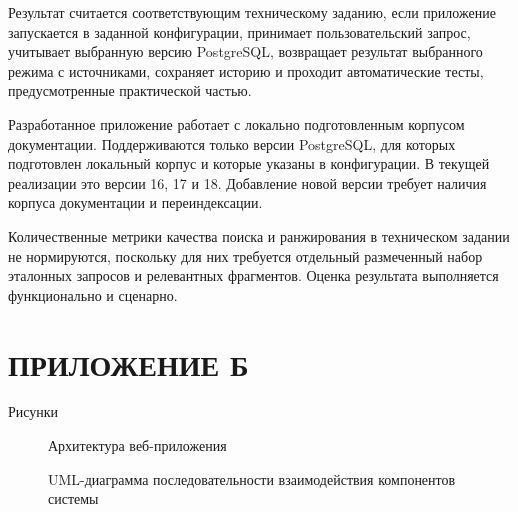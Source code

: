 Результат считается соответствующим техническому заданию, если приложение запускается в заданной конфигурации, принимает пользовательский запрос, учитывает выбранную версию PostgreSQL, возвращает результат выбранного режима с источниками, сохраняет историю и проходит автоматические тесты, предусмотренные практической частью.


Разработанное приложение работает с локально подготовленным корпусом документации. Поддерживаются только версии PostgreSQL, для которых подготовлен локальный корпус и которые указаны в конфигурации. В текущей реализации это версии 16, 17 и 18. Добавление новой версии требует наличия корпуса документации и переиндексации.

Количественные метрики качества поиска и ранжирования в техническом задании не нормируются, поскольку для них требуется отдельный размеченный набор эталонных запросов и релевантных фрагментов. Оценка результата выполняется функционально и сценарно.

\chapter[ПРИЛОЖЕНИЕ Б]{{\fontsize{14pt}{21pt}\selectfont\MakeUppercase{ПРИЛОЖЕНИЕ Б}}}
\label{cha:appendix-figures}
\begin{center}
{\normalfont\fontsize{14pt}{21pt}\selectfont Рисунки}
\end{center}
\setcounter{figure}{0}
\renewcommand{\thefigure}{Б.\arabic{figure}}
\renewcommand{\theHfigure}{appendix-b.\arabic{figure}}

\begin{figure}[H]
\centering
\vspace{10pt}
\caption{Архитектура веб-приложения}
\label{fig:design-architecture}
\end{figure}

\begin{figure}[p]
\centering
{}
\caption{UML-диаграмма последовательности взаимодействия компонентов системы}
\label{fig:design-uml}
\end{figure}

\clearpage
\begin{figure}[p]
\centering
{}
\end{figure}
\clearpage

